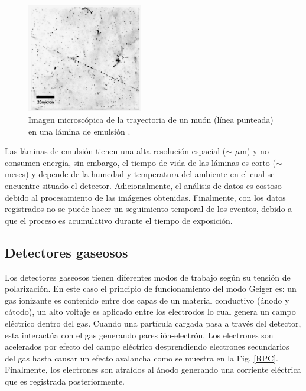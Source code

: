 \begin{figure}[h!]
\begin{center}
\includegraphics[width=0.45\textwidth]{Figures/Emulsion}
\caption[Imagen microscópica de la trayectoria de un muón (línea punteada) en una lámina de emulsión]{Imagen microscópica de la trayectoria de un muón (línea punteada) en una lámina de emulsión \cite{Nishiyama2014}.}
\label{Emulsion}
\end{center}
\end{figure}

Las láminas de emulsión tienen una alta resolución espacial ($\sim$ $\mu$m) y no consumen energía, sin embargo, el tiempo de vida de las láminas es corto ($\sim$ meses) y depende de la humedad y temperatura del ambiente en el cual se encuentre situado el detector. Adicionalmente, el análisis de datos es costoso debido al procesamiento de las imágenes obtenidas. Finalmente, con los datos registrados no se puede hacer un seguimiento temporal de los eventos, debido a que el proceso es acumulativo durante el tiempo de exposición.

\subsection{Detectores gaseosos}

Los detectores gaseosos tienen diferentes modos de trabajo según su tensión de polarización. En este caso el principio de funcionamiento del modo Geiger es: un gas ionizante es contenido entre dos capas de un material conductivo (ánodo y cátodo), un alto voltaje es aplicado entre los electrodos lo cual genera un campo eléctrico dentro del gas. Cuando una partícula cargada pasa a través del detector, esta interactúa con el gas generando pares ión-electrón. Los electrones son acelerados por efecto del campo eléctrico desprendiendo electrones secundarios del gas hasta causar un efecto avalancha como se muestra en la Fig. \ref{RPC}. Finalmente, los electrones son atraídos al ánodo generando una corriente eléctrica que es registrada posteriormente. 

